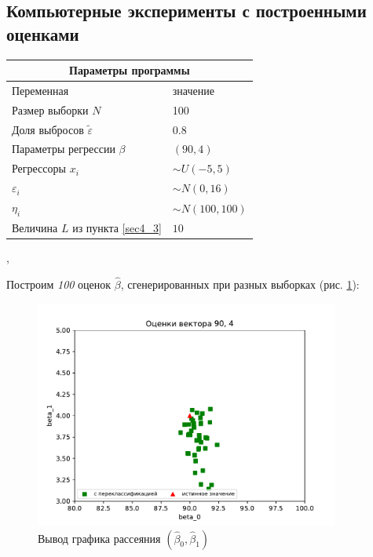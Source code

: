 \documentclass[a4paper,14pt]{extarticle}
\begin{document}
\subsection{Компьютерные эксперименты с построенными оценками}
\begin{center}
    \begin{tabular}{|p{5cm}|p{5cm}|}
        \hline
        \multicolumn{2}{|c|}{Параметры программы} \\
        \hline
        Переменная&значение\\
        \hline
        Размер выборки $N$& 100\\
        \hline
        Доля выбросов $\widetilde{\varepsilon}$& 0.8\\
        \hline
        Параметры регрессии $\beta$& $(90,4)$\\
        \hline
        Регрессоры $x_i$ & $\sim U(-5,5)$\\
        \hline
        $\varepsilon_i$&$\sim N(0,16)$\\
        \hline
        $\eta_i$&$\sim N(100,100)$\\
        \hline
        Величина $L$ из пункта \ref{sec4_3}&$10$\\
        \hline
    \end{tabular},
    \end{center}

Построим \textit{100} оценок $\hat{\beta}$, сгенерированных при разных выборках (рис. \ref{pic2}):

\newpage
\begin{figure}[ht!]
    \centering
    \includegraphics[width=100mm]{pics/plot_90_4_(3).pdf}
    \caption{Вывод графика рассеяния $(\hat{\beta}_0,\hat{\beta}_1)$\label{overflow}}
    \label{pic2}
\end{figure}
\hfill\break
\end{document}
